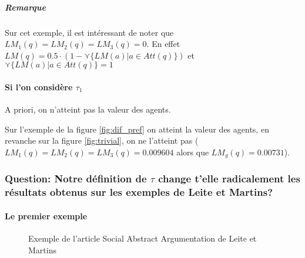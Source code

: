 \documentclass[12pt]{article}
\theoremstyle{defi}
\theoremstyle{not}
\theoremstyle{prob}
\begin{document}
          \subparagraph{Remarque\\}
            Sur cet exemple, il est intéressant de noter que $LM_1(q) = LM_2(q) = LM_3(q) = 0$.
            En effet $LM(q) = 0.5 \cdot (1 - \curlyvee \{LM(a) | a\in Att(q)\})$ et $\curlyvee \{LM(a) | a\in Att(q)\} = 1$


        \paragraph{Si l'on considère $\tau_1$\\}
          A priori, on n'atteint pas la valeur des agents.

          Sur l'exemple de la figure \ref{fig:dif_pref} on atteint la valeur des agents, en revanche sur la figure \ref{fig:trivial}, on ne l'atteint pas ($LM_1(q) = LM_2(q) = LM_3(q) = 0.009604$ alors que $LM_g(q) = 0.00731$).

      \subsubsection{Question: Notre définition de $\tau$ change t'elle radicalement les résultats obtenus sur les exemples de Leite et Martins?}

        \paragraph{Le premier exemple\\}

          \begin{figure}
            \centering
            \caption{Exemple de l'article Social Abstract Argumentation de Leite et Martins}
            \label{fig:LM_example}
          \end{figure}
\end{document}
